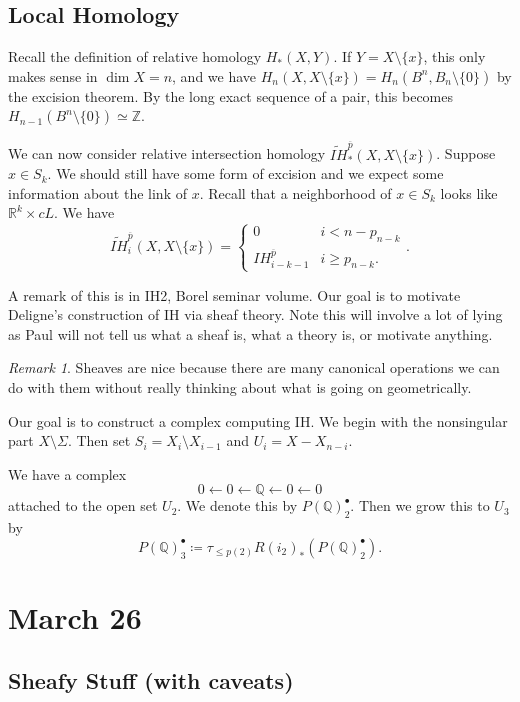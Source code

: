 \documentclass[leqno, openany]{memoir}
\theoremstyle{definition}
\theoremstyle{remark}
\newtheorem{rmk}[thm]{Remark}
\theoremstyle{plain}
\theoremstyle{definition}
\theoremstyle{remark}
\newcommand{\R}{\mathbb{R}}
\newcommand{\Z}{\mathbb{Z}}
\newcommand{\Q}{\mathbb{Q}}
\begin{document}
\section{Local Homology}%

Recall the definition of relative homology $H_*(X,Y)$. If $Y = X \setminus \{ x
\}$, this only makes sense in $\dim X = n$, and we have $H_n(X, X \setminus
\{x\}) = H_n(B^n, B_n \setminus \{0\})$ by the excision theorem. By the long
exact sequence of a pair, this becomes $H_{n-1}(B^n \setminus \{0\}) \simeq
\Z$. 

We can now consider relative intersection homology
$\widetilde{IH}_*^{\overline{p}}(X, X \setminus \{ x \})$. Suppose $x \in S_k$.
We should still have some form of excision and we expect some information about
the link of $x$. Recall that a neighborhood of $x \in S_k$ looks like $\R^k
\times cL$. We have \[ \widetilde{IH}_i^{\overline{p}}(X, X \setminus \{x \}) =
    \begin{cases} 0 & i < n - p_{n-k} \\ IH_{i-k-1}^{\overline{p}} & i \geq
    p_{n-k}.  \end{cases}. \]

A remark of this is in IH2, Borel seminar volume. Our goal is to motivate
Deligne's construction of IH via sheaf theory. Note this will involve a lot of
lying as Paul will not tell us what a sheaf is, what a theory is, or motivate
anything.

\begin{rmk} Sheaves are nice because there are many canonical operations we can
do with them without really thinking about what is going on geometrically.
\end{rmk}

Our goal is to construct a complex computing IH. We begin with the nonsingular
part $X \setminus \Sigma$. Then set $S_i = X_i \setminus X_{i-1}$ and $U_i = X
- X_{n-i}$. 

We have a complex \[ 0 \gets 0 \gets \Q \gets 0 \gets 0 \] attached to the open
set $U_2$. We denote this by $P(\Q)_2^{\bullet}$. Then we grow this to $U_3$ by
\[ P(\Q)_3^{\bullet} \coloneqq \tau_{\leq p(2)} R ( i_2 )_*(P(\Q)_2^{\bullet}).
\]

\chapter{March 26}%

\section{Sheafy Stuff (with caveats)}%
\end{document}
